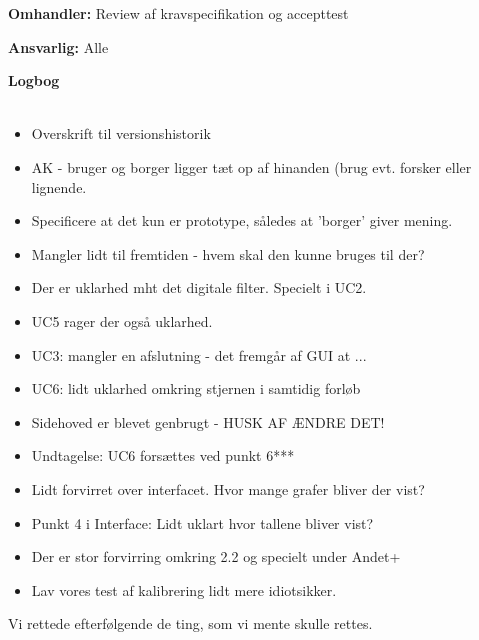 \textbf{Omhandler:} Review af kravspecifikation og accepttest 

\textbf{Ansvarlig:} Alle

\textbf{Logbog}
\\
\\
\begin{itemize}
	\item Overskrift til versionshistorik
	\item AK - bruger og borger ligger tæt op af hinanden (brug evt. forsker eller lignende.
	\item Specificere at det kun er prototype, således at 'borger' giver mening.
	\item Mangler lidt til fremtiden - hvem skal den kunne bruges til der?
	\item Der er uklarhed mht det digitale filter. Specielt i UC2.
	\item UC5 rager der også uklarhed.
	\item UC3: mangler en afslutning - det fremgår af GUI at ...
	\item UC6: lidt uklarhed omkring stjernen i samtidig forløb
	\item Sidehoved er blevet genbrugt - HUSK AF ÆNDRE DET!
	\item Undtagelse: UC6 forsættes ved punkt 6***
	\item Lidt forvirret over interfacet. Hvor mange grafer bliver der vist? 
	\item Punkt 4 i Interface: Lidt uklart hvor tallene bliver vist?
	\item Der er stor forvirring omkring 2.2 og specielt under Andet+
	\item Lav vores test af kalibrering lidt mere idiotsikker. 
\end{itemize}

Vi rettede efterfølgende de ting, som vi mente skulle rettes.


